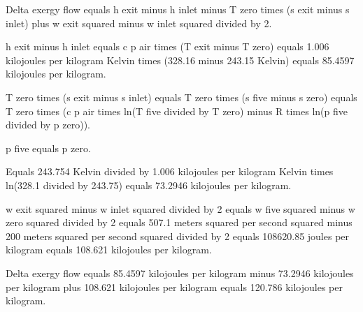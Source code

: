 Delta exergy flow equals h exit minus h inlet minus T zero times (s exit minus s inlet) plus w exit squared minus w inlet squared divided by 2.  

h exit minus h inlet equals c p air times (T exit minus T zero) equals 1.006 kilojoules per kilogram Kelvin times (328.16 minus 243.15 Kelvin) equals 85.4597 kilojoules per kilogram.  

T zero times (s exit minus s inlet) equals T zero times (s five minus s zero) equals T zero times (c p air times ln(T five divided by T zero) minus R times ln(p five divided by p zero)).  

p five equals p zero.  

Equals 243.754 Kelvin divided by 1.006 kilojoules per kilogram Kelvin times ln(328.1 divided by 243.75) equals 73.2946 kilojoules per kilogram.  

w exit squared minus w inlet squared divided by 2 equals w five squared minus w zero squared divided by 2 equals 507.1 meters squared per second squared minus 200 meters squared per second squared divided by 2 equals 108620.85 joules per kilogram equals 108.621 kilojoules per kilogram.  

Delta exergy flow equals 85.4597 kilojoules per kilogram minus 73.2946 kilojoules per kilogram plus 108.621 kilojoules per kilogram equals 120.786 kilojoules per kilogram.